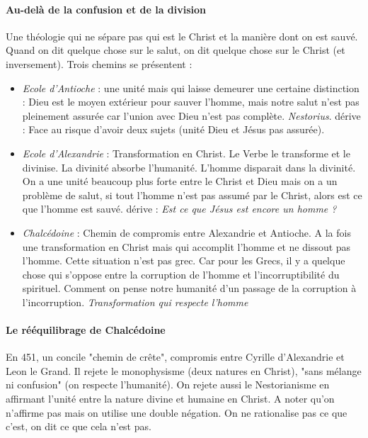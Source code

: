   \paragraph{Au-delà de la confusion et de la division}  
  
  Une théologie qui ne sépare pas qui est le Christ et la manière dont on est sauvé. Quand on dit quelque chose sur le salut, on dit quelque chose sur le Christ (et inversement).
  Trois chemins se présentent : 
  \begin{itemize}
      \item \textit{Ecole d'Antioche} : une unité mais qui laisse demeurer une certaine distinction : Dieu est le moyen extérieur pour sauver l'homme, mais notre salut n'est pas pleinement assurée car l'union avec Dieu n'est pas complète. \textit{Nestorius}. dérive : Face au risque d'avoir deux sujets (unité Dieu et Jésus pas assurée). 
      \item \textit{Ecole d'Alexandrie} : Transformation en Christ. Le Verbe le transforme et le divinise. La divinité absorbe l'humanité. L'homme disparait dans la divinité. On a une unité beaucoup plus forte entre le Christ et Dieu mais on a un problème de salut, si tout l'homme n'est pas assumé par le Christ, alors est ce que l'homme est sauvé. dérive : \textit{Est ce que Jésus est encore un homme ?}
      \item \textit{Chalcédoine } : Chemin de compromis entre Alexandrie et Antioche. A la fois une transformation en Christ mais qui accomplit l'homme et ne dissout pas l'homme. Cette situation n'est pas grec. Car pour les Grecs, il y a quelque chose qui s'oppose entre la corruption de l'homme et l'incorruptibilité du spirituel. Comment on pense notre humanité d'un passage de la corruption à l'incorruption. \textit{Transformation qui respecte l'homme}
      
  \end{itemize}
    
  \paragraph{Le rééquilibrage de Chalcédoine}
   
   En 451, un concile "chemin de crête", compromis entre Cyrille d'Alexandrie et Leon le Grand. Il rejete le monophysisme (deux natures en Christ), "sans mélange ni confusion" (on respecte l'humanité). On rejete aussi le Nestorianisme en affirmant l'unité entre la nature divine et humaine en Christ.
   A noter qu'on n'affirme pas mais on utilise une double négation. On ne rationalise pas ce que c'est, on dit ce que cela n'est pas. 
   
